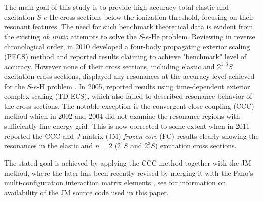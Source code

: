 \documentclass[aip
, pra
, showpacs
, aps
, twocolumn
, groupedaddress
, floatfix
]{revtex4}
\begin{document}
The main goal of this study is to provide high accuracy total elastic and excitation $S$-$e$-He cross sections below the ionization threshold, focusing on their resonant features.
The need for such benchmark theoretical data is evident from the existing {\em ab initio} attempts to solve the $S$-$e$-He problem.
Reviewing in reverse chronological order, in 2010 \citet{BS10p022715} developed a four-body propagating exterior scaling (PECS) method and reported results claiming to achieve "benchmark" level of accuracy.
However none of their cross sections, including elastic and $2^{1,3}S$ excitation cross sections, displayed any resonances at the accuracy level achieved for the $S$-$e$-H problem \cite{P78}.
In 2005, \citet{HMR05} reported results using
time-dependent exterior complex scaling (TD-ECS), which also failed to described resonance behavior of the cross sections.
The notable exception is the convergent-close-coupling (CCC) method which in 2002 and 2004 \cite{PBFS02,PNBFS04}
did not examine the resonance regions with sufficiently fine energy grid.
This is now corrected to some extent when in 2011 \citet{KFB11} reported the CCC and $J$-matrix (JM) {\em frozen-core}
(FC) results clearly showing the resonances in the elastic and $n=2$ ($2^1S$ and $2^3S$) excitation cross sections.


The stated goal is achieved by applying the CCC method together with the JM method,
where the later has been recently revised by merging it with the Fano's multi-configuration interaction matrix elements \cite{Fano65},
see \cite{JMatrixWebsite} for information on availability of the JM source code used in this paper.
\end{document}

